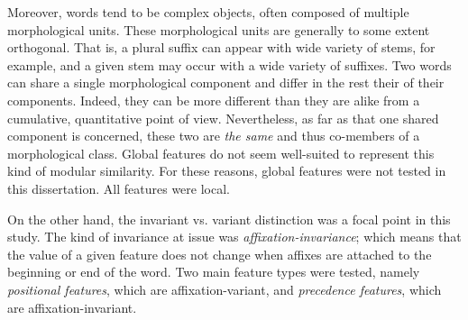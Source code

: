 Moreover, words tend to be complex objects, often composed of multiple morphological units.
These morphological units are generally to some extent orthogonal. That is, a
plural suffix can appear with wide variety of stems, for example, and a given stem may occur with a wide variety of suffixes.
Two words can share a single morphological component and differ in the rest their of their components. Indeed,
they can be more different than they are alike from a cumulative, quantitative point of view. Nevertheless,
as far as that one shared component is concerned, these two are \emph{the same} and thus co-members of a morphological
class. Global features do not seem well-suited to represent this kind of modular similarity. For
these reasons, global features were not tested in this dissertation. All features were local. 

On the other hand, the invariant vs. variant distinction was a focal point in this study.
The kind of invariance at issue was \emph{affixation-invariance}; which means that the value of a given feature does not change
when affixes are attached to the beginning or end of the word. 
Two main feature types were tested, namely \emph{positional features}, which are affixation-variant, 
and \emph{precedence features}, which are affixation-invariant.


